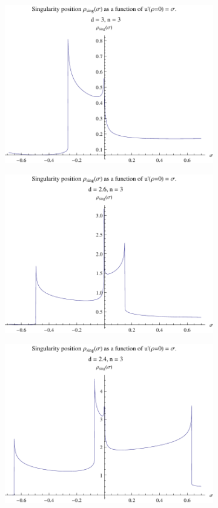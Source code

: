 \begin{figure}[htp]
\centering
\begin{subfigure}{.33\textwidth}
	\centering
	\includegraphics[width=.9\linewidth]{img/chap4/on_d3_n3.pdf}
	\caption{}
	\label{on_d_3}
	\end{subfigure}%
\begin{subfigure}{.33\textwidth}
	\centering
	\includegraphics[width=.9\linewidth]{img/chap4/on_d2p6_n3.pdf}
	\caption{}
	\label{on_d_2p6}
\end{subfigure}%
\begin{subfigure}{.33\textwidth}
	\centering
	\includegraphics[width=.9\linewidth]{img/chap4/on_d2p4_n3.pdf}

\end{subfigure}
\end{figure}

